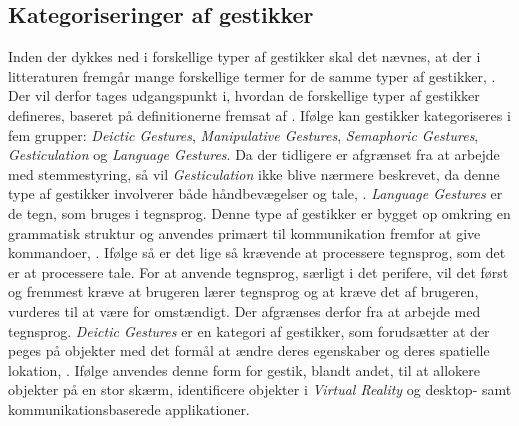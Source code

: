 \subsection{Kategoriseringer af gestikker}
\label{KategoriseringerAfGestikker}
%
Inden der dykkes ned i forskellige typer af gestikker skal det nævnes, at der i litteraturen fremgår mange forskellige termer for de samme typer af gestikker, \parencite[s. 3]{PDF:ATaxonomyOfGestures}. Der vil derfor tages udgangspunkt i, hvordan de forskellige typer af gestikker defineres, baseret på definitionerne fremsat af \textcite[ss. 4-9]{PDF:ATaxonomyOfGestures}. Ifølge \textcite[s. 4]{PDF:ATaxonomyOfGestures} kan gestikker kategoriseres i fem grupper: \textit{Deictic Gestures}, \textit{Manipulative Gestures}, \textit{Semaphoric Gestures}, \textit{Gesticulation} og \textit{Language Gestures}. \blankline
%
Da der tidligere er afgrænset fra at arbejde med stemmestyring, så vil \textit{Gesticulation} ikke blive nærmere beskrevet, da denne type af gestikker involverer både håndbevægelser og tale, \parencite[s. 7]{PDF:ATaxonomyOfGestures}. \textit{Language Gestures} er de tegn, som bruges i tegnsprog. Denne type af gestikker er bygget op omkring en grammatisk struktur og anvendes primært til kommunikation fremfor at give kommandoer, \parencite[s. 8]{PDF:ATaxonomyOfGestures}. Ifølge \textcite[s. 8]{PDF:ATaxonomyOfGestures} så er det lige så krævende at processere tegnsprog, som det er at processere tale. For at anvende tegnsprog, særligt i det perifere, vil det først og fremmest kræve at brugeren lærer tegnsprog og at kræve det af brugeren, vurderes til at være for omstændigt. Der afgrænses derfor fra at arbejde med tegnsprog. \blankline
%  
\textit{Deictic Gestures} er en kategori af gestikker, som forudsætter at der peges på objekter med det formål at ændre deres egenskaber og deres spatielle lokation, \parencite[s. 4]{PDF:ATaxonomyOfGestures}. Ifølge \textcite[ss. 4-5]{PDF:ATaxonomyOfGestures} anvendes denne form for gestik, blandt andet, til at allokere objekter på en stor skærm, identificere objekter i \textit{Virtual Reality} og desktop- samt kommunikationsbaserede applikationer. \blankline
%
